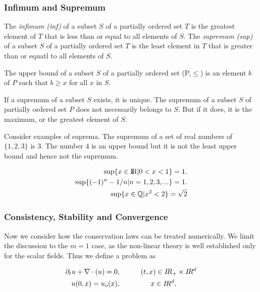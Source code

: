 \subsubsection*{Infimum and Supremum}

The \textit{infimum (inf)} of a subset $S$ of a partially ordered set $T$ is the greatest element of $T$ that is less than or equal to all elements of $S$.
The \textit{supremum (sup)} of a subset $S$ of a partially ordered set $T$ is the least element in $T$ that is greater than or equatl to all elements of $S$. 

The upper bound of a subset $S$ of a partially ordered set (P,$\leq$) is an element $b$ of $P$ such that $b\geq x$ for all $x$ in $S$. 

If a supremum of a subset $S$ exists, it is unique. 
The supremum of a subset $S$ of partially ordered set $P$ does not necessarily belongs to $S$. But if it does, it is the maximum, or the greatest element of $S$. 

Consider examples of suprema. The supremum of a set of real numbers of $\{1,2,3\}$ is $3$. The number $4$ is an upper bound but it is not the least upper bound and hence not the supremum. 

\begin{align}
\sup\{x\in\text{I\!R}|0<x<1\} = 1. \\
\sup\{(-1)^n - 1/n | n = 1,2,3,... \} = 1. \\
\sup\{x\in\mathbb{Q} | x^2 < 2\} = \sqrt{2}
\end{align}


\subsubsection{Consistency, Stability and Convergence}


Now we consider how the conservation laws can be treated numerically. 
We limit the discussion to the $m=1$ case, as the non-linear theory is well established only for the scalar fields. 
Thus we define a problem as 

\begin{align}
\partial_t u + \nabla\cdot\boldmath(u) = 0&, \hspace{10mm} (t,x) \in I\!R_{+}\times I\! R^d \\ 
u(0, x) = u_o(x)&, \hspace{15mm} x\in I\!R^{d},
\end{align}

